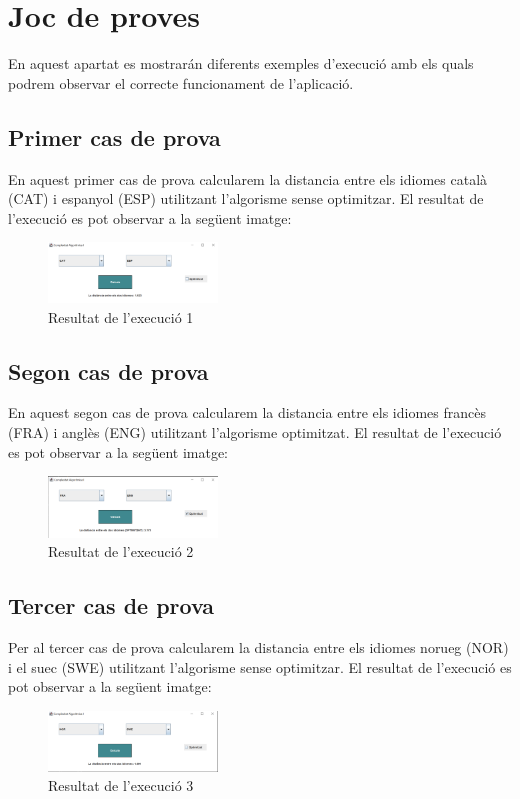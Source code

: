 \documentclass[conference]{IEEEtran}
\begin{document}
\section{Joc de proves}
En aquest apartat es mostrarán diferents exemples d'execució amb els quals podrem observar el correcte funcionament de l'aplicació.
\subsection{Primer cas de prova}
En aquest primer cas de prova calcularem la distancia entre els idiomes català (CAT) i espanyol (ESP) utilitzant l'algorisme sense optimitzar. El resultat de l'execució es pot observar a la següent imatge:
\begin{figure}[ht]
    \centering
    \includegraphics[width=0.4\textwidth]{images/execucio1.png}
    \caption{Resultat de l'execució 1}
\end{figure}

\subsection{Segon cas de prova}
En aquest segon cas de prova calcularem la distancia entre els idiomes francès (FRA) i anglès (ENG) utilitzant l'algorisme optimitzat. El resultat de l'execució es pot observar a la següent imatge:
\begin{figure}[ht]
    \centering
    \includegraphics[width=0.4\textwidth]{images/execucio2.png}
    \caption{Resultat de l'execució 2}
\end{figure}
\subsection{Tercer cas de prova}
Per al tercer cas de prova calcularem la distancia entre els idiomes norueg (NOR) i el suec (SWE) utilitzant l'algorisme sense optimitzar. El resultat de l'execució es pot observar a la següent imatge:
\begin{figure}[ht]
    \centering
    \includegraphics[width=0.4\textwidth]{images/execucio3.png}
    \caption{Resultat de l'execució 3}
\end{figure}
\end{document}
